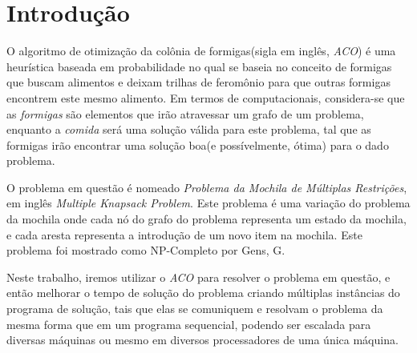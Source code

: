 \section{Introdução}
	O algoritmo de otimização da colônia de formigas(sigla em inglês, {\it ACO}) é uma heurística baseada em probabilidade no qual se baseia no conceito de formigas que buscam alimentos e deixam trilhas de feromônio para que outras formigas encontrem este mesmo alimento\cite{antsystem}. Em termos de computacionais, considera-se que as \textit{formigas} são elementos que irão atravessar um grafo de um problema, enquanto a \textit{comida} será uma solução válida para este problema, tal que as formigas irão encontrar uma solução boa(e possívelmente, ótima) para o dado problema.
	
	O problema em questão é nomeado \textit{Problema da Mochila de Múltiplas Restrições}, em inglês \textit{Multiple Knapsack Problem}. Este problema é uma variação do problema da mochila onde cada nó do grafo do problema representa um estado da mochila, e cada aresta representa a introdução de um novo item na mochila. Este problema foi mostrado como NP-Completo por Gens, G\cite{complexity}.
	
	Neste trabalho, iremos utilizar o \textit{ACO} para resolver o problema em questão, e então melhorar o tempo de solução do problema criando múltiplas instâncias do programa de solução, tais que elas se comuniquem e resolvam o problema da mesma forma que em um programa sequencial, podendo ser escalada para diversas máquinas ou mesmo em diversos processadores de uma única máquina.